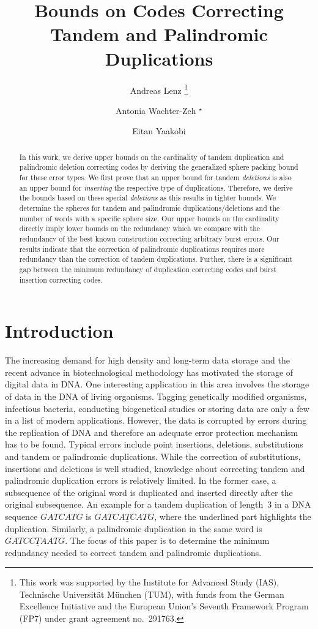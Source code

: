 \documentclass[a4paper]{llncs}
\title{Bounds on Codes Correcting Tandem and Palindromic Duplications}
\author{Andreas Lenz \inst{1} \thanks{This work was supported by the Institute for Advanced Study (IAS), Technische Universit\"{a}t M\"{u}nchen (TUM), with funds from the German Excellence Initiative and the European Union's Seventh Framework Program (FP7) under grant agreement no.~291763.} \and Antonia Wachter-Zeh \inst{1} $^\star$ \and Eitan Yaakobi \inst{2} }
\institute{Institute for Communications Engineering, \\Technical University of Munich, Germany \and Computer Science Department, \\ Technion -- Israel Institute of Technology, Haifa, Israel \\
	\email{andreas.lenz@mytum.de, antonia.wachter-zeh@tum.de, yaakobi@cs.technion.ac.il}}
\begin{document}
	
	\maketitle
	\begin{abstract}
		In this work, we derive upper bounds on the cardinality of tandem duplication and palindromic deletion correcting codes by deriving the generalized sphere packing bound for these error types. We first prove that an upper bound for tandem \emph{deletions} is also an upper bound for \emph{inserting} the respective type of duplications. Therefore, we derive the bounds based on these special \emph{deletions} as this results in tighter bounds. We determine the spheres for tandem and palindromic duplications/deletions and the number of words with a specific sphere size. 
		Our upper bounds on the cardinality directly imply lower bounds on the redundancy which we compare with the redundancy of the best known construction correcting arbitrary burst errors.
		Our results indicate that the correction of palindromic duplications requires more redundancy than the correction of tandem duplications. Further, there is a significant gap between the minimum redundancy of duplication correcting codes and burst insertion correcting codes.
	\end{abstract}
	
	
	
	\section{Introduction}
	The increasing demand for high density and long-term data storage and the recent advance in biotechnological methodology has motivated the storage of digital data in DNA. One interesting application in this area involves the storage of data in the DNA of living organisms. Tagging genetically modified organisms, infectious bacteria, conducting biogenetical studies or storing data are only a few in a list of modern applications. However, the data is corrupted by errors during the replication of DNA and therefore an adequate error protection mechanism has to be found. Typical errors include point insertions, deletions, substitutions and tandem or palindromic duplications. While the correction of substitutions, insertions and deletions is well studied, knowledge about correcting tandem and palindromic duplication errors is relatively limited. In the former case, a subsequence of the original word is duplicated and inserted directly after the original subsequence.
	An example for a tandem duplication of length~$3$ in a DNA sequence $GATCATG$ is $GATC\underline{ATC}ATG$, where the underlined part highlights the duplication. Similarly, a palindromic duplication in the same word is $GATC\underline{CTA}ATG$. The focus of this paper is to determine the minimum redundancy needed to correct tandem and palindromic duplications.
	
\end{document}
